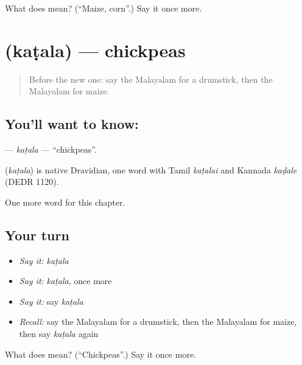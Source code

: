 \begin{tcolorbox}[breakable,colback=teal!4,colframe=teal!35!black,title={Before you move on}]
What does  mean? (\textquotedblleft{}Maize, corn\textquotedblright{}.) Say it once more.
\end{tcolorbox}
\section[\texorpdfstring{\ml{കടല} (kaṭala)}{കടല (kaṭala)}]{ (kaṭala) — chickpeas}

\label{lesson:ML-C259-katala}



\begin{quote}
Before the new one: say the Malayalam for a drumstick, then the Malayalam for maize.
\end{quote}

\subsection*{You'll want to know: }
\textbf{} — \emph{kaṭala} — \textquotedblleft{}chickpeas\textquotedblright{}.

\begin{cousinweb}
\textbf{} (\emph{kaṭala}) is native Dravidian, one word with Tamil \emph{kaṭalai} and Kannada \emph{kaḍale} (DEDR 1120).
\end{cousinweb}

\begin{grammarlens}[title={What you've built}]
One more word for this chapter.
\end{grammarlens}

\subsection*{Your turn}
\begin{itemize}
\raggedright
  \item \emph{Say it:} \emph{kaṭala}
  \item \emph{Say it:} \emph{kaṭala}, once more
  \item \emph{Say it:} say \emph{kaṭala}
  \item \emph{Recall:} say the Malayalam for a drumstick, then the Malayalam for maize, then say \emph{kaṭala} again
\end{itemize}

\begin{tcolorbox}[breakable,colback=teal!4,colframe=teal!35!black,title={Before you move on}]
What does  mean? (\textquotedblleft{}Chickpeas\textquotedblright{}.) Say it once more.
\end{tcolorbox}
